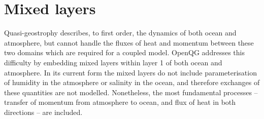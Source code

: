 \documentclass[11pt, a4paper,twoside]{article}
\numberwithin{equation}{section}
\begin{document}
\section{Mixed layers}\label{sec:mixed}
Quasi-geostrophy describes, to first order, the dynamics of both ocean and atmosphere, but cannot handle the fluxes of heat and momentum between these two domains which are required for a coupled model.
OpenQG addresses this difficulty by embedding mixed layers within layer 1 of both ocean and atmosphere.
In its current form the mixed layers do not include parameterisation of humidity in the atmosphere or salinity in the ocean, and therefore exchanges of these quantities are not modelled.
Nonetheless, the most fundamental processes -- transfer of momentum from atmosphere to ocean, and flux of heat in both directions -- are included.
\end{document}
